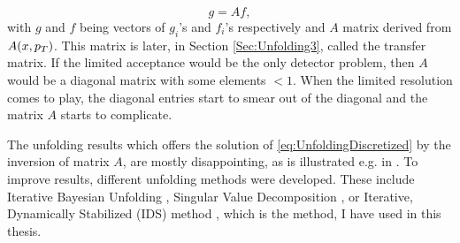 \begin{equation}
  g = Af,
  \label{eq:UnfoldingDiscretized}
\end{equation}
with $g$ and $f$ being vectors of $g_i$'s and $f_i$'s respectively and $A$
matrix derived from $A(x, p_{T})$. This matrix is later, in Section
\ref{Sec:Unfolding3}, called the transfer matrix. If the limited acceptance
would be the only detector problem, then $A$ would be a diagonal matrix with some
elements $ < 1$. When the limited resolution comes to play, the diagonal entries
start to smear out of the diagonal and the matrix $A$ starts to complicate.

The unfolding results which offers the solution of
\eqref{eq:UnfoldingDiscretized} by the inversion of matrix $A$, are mostly
disappointing, as is illustrated e.g. in \cite{UnfoldingExplained}. To improve
results, different unfolding methods were developed. These include Iterative
Bayesian Unfolding \cite{IterativeBayesianUnfolding}, Singular Value
Decomposition \cite{SingularValueDecomposition}, or Iterative, Dynamically
Stabilized (IDS) method \cite{IterativeDynamicallyStabilized}, which is the
method, I have used in this thesis. 


